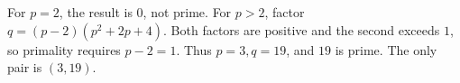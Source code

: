 For $p=2$, the result is $0$, not prime. For $p>2$, factor $q=(p-2)(p^2+2p+4)$. Both factors are positive and the second exceeds $1$, so primality requires $p-2=1$. Thus $p=3,q=19$, and $19$ is prime. The only pair is $\boxed{(3,19)}$.
